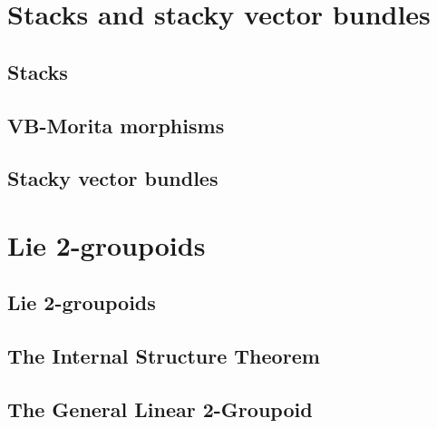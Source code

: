 


\chapter{Stacks and stacky vector bundles}\label{ch:stacks-and-syacky-vb}



\section{Stacks}



\section{VB-Morita morphisms}\label{sec:VB-Morita}



\section{Stacky vector bundles}




\chapter{Lie 2-groupoids}\label{ch:lie-2-gpds}

\section{Lie 2-groupoids}



\section{The Internal Structure Theorem}



\section{The General Linear 2-Groupoid}\label{sec:gl2gpd}


